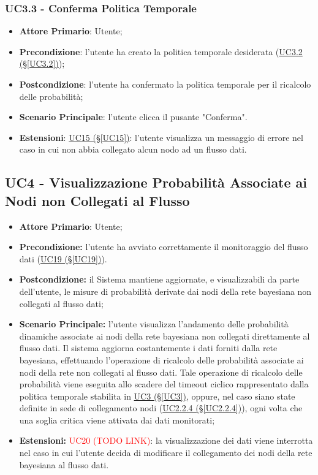 \subsubsection{UC3.3 - Conferma Politica Temporale}\label{UC3.3}
\begin{itemize}
	\item \textbf{Attore Primario}: Utente; 
	\item \textbf{Precondizione}: l'utente ha creato la politica temporale desiderata (\hyperref[UC3.2]{UC3.2 (§\ref*{UC3.2})});
	\item \textbf{Postcondizione}: l'utente ha confermato la politica temporale per il ricalcolo delle probabilità; 
	\item \textbf{Scenario Principale}: l'utente clicca il pusante "Conferma".
	\item \textbf{Estensioni}: \hyperref[UC15]{UC15 (§\ref*{UC15})}: l'utente visualizza un messaggio di errore nel caso in cui non abbia collegato alcun nodo ad un flusso dati.
\end{itemize}

\newpage

\subsection{UC4 - Visualizzazione Probabilità Associate ai Nodi non Collegati al Flusso}\label{UC4}

\begin{itemize}
\item \textbf{Attore Primario}: Utente;
\item \textbf{Precondizione:} l'utente ha avviato correttamente il monitoraggio del flusso dati (\hyperref[UC19]{UC19 (§\ref*{UC19})}).
\item \textbf{Postcondizione:} il Sistema mantiene aggiornate, e visualizzabili da parte dell'utente, le misure di probabilità derivate dai nodi della rete bayesiana non collegati al flusso dati;
\item \textbf{Scenario Principale:} l'utente visualizza l'andamento delle probabilità dinamiche associate ai nodi 			della rete bayesiana non collegati direttamente al flusso dati. Il sistema aggiorna costantemente i dati forniti dalla rete bayesiana, effettuando l'operazione di ricalcolo delle probabilità associate ai nodi della rete non collegati al flusso dati. Tale operazione di ricalcolo delle probabilità viene eseguita allo scadere del timeout ciclico rappresentato dalla politica temporale stabilita in \hyperref[UC3]{UC3 (§\ref*{UC3})}, oppure, nel caso siano state definite in sede di collegamento nodi (\hyperref[UC2.2.4]{UC2.2.4 (§\ref*{UC2.2.4})}), ogni volta che una soglia critica viene attivata dai dati monitorati;
\item \textbf{Estensioni:} \textcolor{red}{UC20 (TODO LINK)}: la visualizzazione dei dati viene interrotta nel 			caso in cui l'utente decida di modificare il collegamento dei nodi della rete bayesiana al flusso dati.
\end{itemize}

